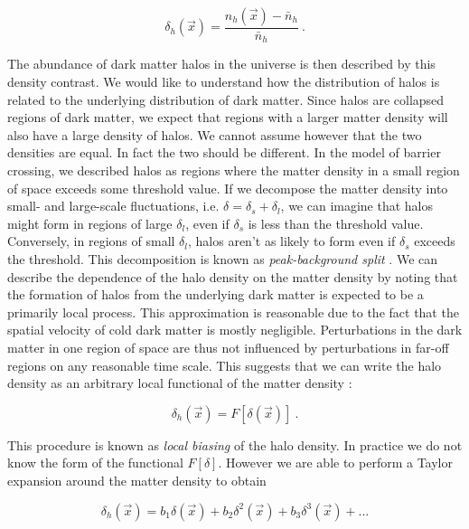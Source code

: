 \documentclass[10pt,letterpaper,final]{iopart}
\numberwithin{equation}{subsection}
\def\ni{\noindent}
\begin{document}
\begin{equation}\label{eq:deltah}
\delta_h(\vec{x}) = \frac{n_h(\vec{x}) - \bar{n}_h}{\bar{n}_h} \ .
\end{equation}

\ni The abundance of dark matter halos in the universe is then described by this density contrast. We would like to understand how the distribution of halos is related to the underlying distribution of dark matter. Since halos are collapsed regions of dark matter, we expect that regions with a larger matter density will also have a large density of halos. We cannot assume however that the two densities are equal. In fact the two should be different. In the model of barrier crossing, we described halos as regions where the matter density in a small region of space exceeds some threshold value. If we decompose the matter density into small- and large-scale fluctuations, i.e. $\delta = \delta_s + \delta_l$, we can imagine that halos might form in regions of large $\delta_l$, even if $\delta_s$ is less than the threshold value. Conversely, in regions of small $\delta_l$, halos aren't as likely to form even if $\delta_s$ exceeds the threshold. This decomposition is known as \emph{peak-background split} \cite{Schneider}. We can describe the dependence of the halo density on the matter density by noting that the formation of halos from the underlying dark matter is expected to be a primarily local process. This approximation is reasonable due to the fact that the spatial velocity of cold dark matter is mostly negligible. Perturbations in the dark matter in one region of space are thus not influenced by perturbations in far-off regions on any reasonable time scale. This suggests that we can write the halo density as an arbitrary local functional of the matter density \cite{Schneider}\cite{Halo1}\cite{HaloBias1}\cite{HaloBias2}\cite{HaloBias3}\cite{HaloBias4}:

\begin{equation}\label{eq:localbias}
\delta_h(\vec{x}) = F[\delta(\vec{x})] \ .
\end{equation}

\ni This procedure is known as \emph{local biasing} of the halo density. In practice we do not know the form of the functional $F[\delta]$. However we are able to perform a Taylor expansion around the matter density to obtain

\begin{equation}\label{eq:localbias2}
\delta_h(\vec{x}) = b_1 \delta(\vec{x}) + b_2 \delta^2(\vec{x}) + b_3\delta^3(\vec{x}) + ...
\end{equation}
\end{document}
